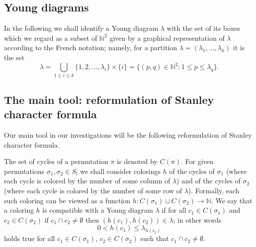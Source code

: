 \documentclass[12pt]{amsart}
\theoremstyle{plain}
\newtheorem{conjecture}[lemma]{Conjecture}
\theoremstyle{remark}
\newcommand{\N}{\mathbb{N}}
\DeclareMathOperator{\supp}{supp}
\begin{document}


\subsection{Young diagrams}
In the following we shall identify a Young diagram $\lambda$
with the set of its boxes which we regard as a subset of $\N^2$
given by a graphical representation of $\lambda$ according to the French notation;
namely, for a partition $\lambda=(\lambda_1,\dots,\lambda_k)$ 
it is the set
\begin{equation}
\label{eq:identifyNatural}
\lambda = \bigcup_{1\leq i\leq k}   \{1,2,\dots,\lambda_i\} \times  \{i\}=
\{(p,q)\in\N^2: 1\leq p \leq \lambda_q\}.   
\end{equation}


\subsection{The main tool: reformulation of Stanley character formula}
\label{subsec:mainresult}

Our main tool in our investigations will be the following reformulation of 
Stanley character formula.

The set of cycles of a permutation $\pi$ is denoted by $C(\pi)$.
For given permutations $\sigma_1,\sigma_2\in S_l$ we shall consider 
colorings $h$ of the cycles of $\sigma_1$ (where each cycle is colored by the
number of some column of $\lambda$) and of the cycles of $\sigma_2$ 
(where each cycle is colored by the number of some row of $\lambda$). Formally,
each such coloring can be viewed as a function
$h:C(\sigma_1) \sqcup C(\sigma_2)\rightarrow\N$.
We say that a coloring $h$
is compatible with a Young diagram $\lambda$ if for all
$c_1\in C(\sigma_1)$ and $c_2\in C(\sigma_2)$ if $c_1\cap c_2\neq \emptyset $ then
$(h(c_1),h(c_2))\in\lambda$; in other words
\begin{equation}
\label{eq:warunek}
0<h(c_1)\leq \lambda_{h(c_2)}
\end{equation}
holds true for all $c_1\in C(\sigma_1)$, $c_2\in C(\sigma_2)$ such that $c_1\cap
c_2\neq\emptyset$.
\end{document}
